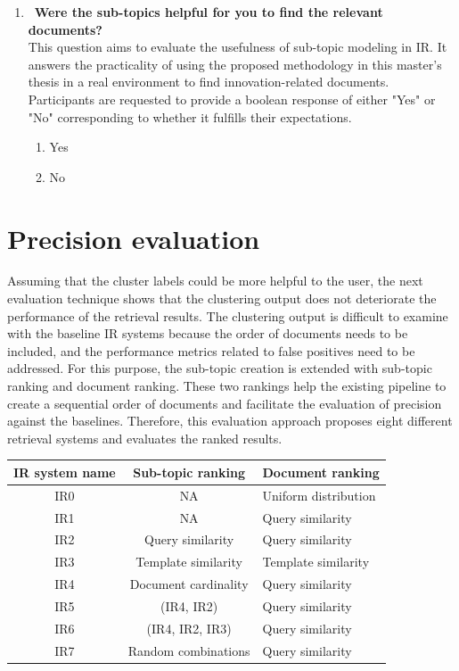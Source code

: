 \begin{enumerate}
	\item ~\textbf{Were the sub-topics helpful for you to find the relevant documents?} \\
	
This question aims to evaluate the usefulness of sub-topic modeling in \ac{IR}. It answers the practicality of using the proposed methodology in this master's thesis in a real environment to find innovation-related documents. Participants are requested to provide a boolean response of either "Yes" or "No" corresponding to whether it fulfills their expectations.

	
	\begin{enumerate}
		\item Yes
		\item No
	\end{enumerate}
	
\end{enumerate}

\section{Precision evaluation}

Assuming that the cluster labels could be more helpful to the user, the next evaluation technique shows that the clustering output does not deteriorate the performance of the retrieval results. The clustering output is difficult to examine with the baseline \ac{IR} systems because the order of documents needs to be included, and the performance metrics related to false positives need to be addressed. For this purpose, the sub-topic creation is extended with sub-topic ranking and document ranking. These two rankings help the existing pipeline to create a sequential order of documents and facilitate the evaluation of precision against the baselines. Therefore, this evaluation approach proposes eight different retrieval systems and evaluates the ranked results.


\begin{center}
	\label{tab:ir_systems}
	\begin{tabularx}{0.8\textwidth}{|c|c|Y|}
		\hline
		 IR system name & Sub-topic ranking & Document ranking \\
		\hline
		 IR0 & NA & Uniform distribution \\
		\hline
		 IR1 & NA & Query similarity \\
		\hline
		 IR2 & Query similarity & Query similarity \\
		\hline
		 IR3 & Template similarity & Template similarity \\
		\hline
		 IR4 & Document cardinality & Query similarity \\
		\hline
		 IR5 & (IR4, IR2) & Query similarity \\
		\hline
		 IR6 & (IR4, IR2, IR3) & Query similarity \\
		\hline
		 IR7 & Random combinations & Query similarity \\
		\hline
	\end{tabularx}
\end{center}

